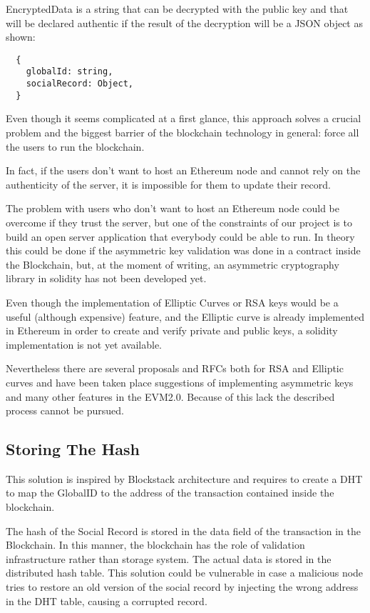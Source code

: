 EncryptedData is a string that can be decrypted with the public key and that will be declared authentic if the result of the decryption will be a JSON object as shown:

\begin{lstlisting}
  {
	globalId: string,
	socialRecord: Object,
  }
\end{lstlisting}

Even though it seems complicated at a first glance, this approach solves a crucial problem and the biggest barrier of the blockchain technology in general: force all the users to run the blockchain.

In fact, if the users don’t want to host an Ethereum node and cannot rely on the authenticity of the server, it is impossible for them to update their record.

The problem with users who don’t want to host an Ethereum node could be overcome if they trust the server, but one of the constraints of our project is to build an open server application that everybody could be able to run. In theory this could be done if the asymmetric key validation was done in a contract inside the Blockchain, but, at the moment of writing, an asymmetric cryptography library in solidity has not been developed yet.

Even though the implementation of Elliptic Curves or RSA keys would be a useful (although expensive) feature, and the Elliptic curve is already implemented in Ethereum in order to create and verify private and public keys, a solidity implementation is not yet available.

Nevertheless there are several proposals and RFCs both for RSA and Elliptic curves \citep{ECImplementation} \citep{RSAImplementation} and have been taken place suggestions of implementing asymmetric keys and many other features in the EVM2.0.
Because of this lack the described process cannot be pursued.

\subsection{Storing The Hash}
This solution is inspired by Blockstack architecture and requires to create a DHT to map the GlobalID to the address of the transaction contained inside the blockchain.

The hash of the Social Record is stored in the data field of the transaction in the Blockchain. In this manner, the blockchain has the role of validation infrastructure rather than storage system. The actual data is stored in the distributed hash table. This solution could be vulnerable in case a malicious node tries to restore an old version of the social record by injecting the wrong address in the DHT table, causing a corrupted record.

